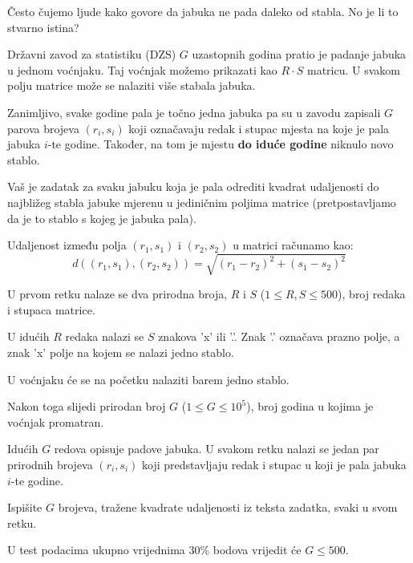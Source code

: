 \renewcommand{\taskname}{JABUKE}
\renewcommand{\timelimit}{2 sekunde}
\renewcommand{\memorylimit}{128 MB}
\renewcommand{\score}{140 bodova}

Često čujemo ljude kako govore da jabuka ne pada daleko od stabla. No je li to stvarno istina? 

Državni zavod za statistiku (DZS) $G$ uzastopnih godina pratio je padanje jabuka u jednom voćnjaku. Taj voćnjak možemo prikazati kao $R \cdot S$ matricu. U svakom polju matrice može se nalaziti više stabala jabuka.

Zanimljivo, svake godine pala je točno jedna jabuka pa su u zavodu zapisali $G$ parova brojeva $(r_i, s_i)$ koji označavaju redak i stupac mjesta na koje je pala jabuka $i$-te godine. Također, na tom je mjestu \textbf{do iduće godine} niknulo novo stablo.

Vaš je zadatak za svaku jabuku koja je pala odrediti kvadrat udaljenosti do najbližeg stabla jabuke mjerenu u jediničnim poljima matrice (pretpostavljamo da je to stablo s kojeg je jabuka pala).

Udaljenost između polja $(r_1, s_1)$ i $(r_2, s_2)$ u matrici računamo kao:
\[ d((r_1, s_1), (r_2, s_2)) = \sqrt{(r_1-r_2)^2 + (s_1-s_2)^2} \]

\strut


U prvom retku nalaze se dva prirodna broja, $R$ i $S$ ($1 \leqslant R, S \leqslant 500$), broj redaka i stupaca matrice.

U idućih $R$ redaka nalazi se $S$ znakova 'x' ili '.'.  Znak '.' označava prazno polje, a znak 'x' polje na kojem se nalazi jedno stablo.

U voćnjaku će se na početku nalaziti barem jedno stablo.

Nakon toga slijedi prirodan broj $G$ ($1 \leqslant G \leqslant 10^5$), broj godina u kojima je voćnjak promatran.

Idućih $G$ redova opisuje padove jabuka. U svakom retku nalazi se jedan par prirodnih brojeva $(r_i, s_i)$ koji predstavljaju redak i stupac u koji je pala jabuka $i$-te godine. 

\strut


Ispišite $G$ brojeva, tražene kvadrate udaljenosti iz teksta zadatka, svaki u svom retku.

\strut


U test podacima ukupno vrijednima 30\% bodova vrijedit će $G \leqslant 500$.

